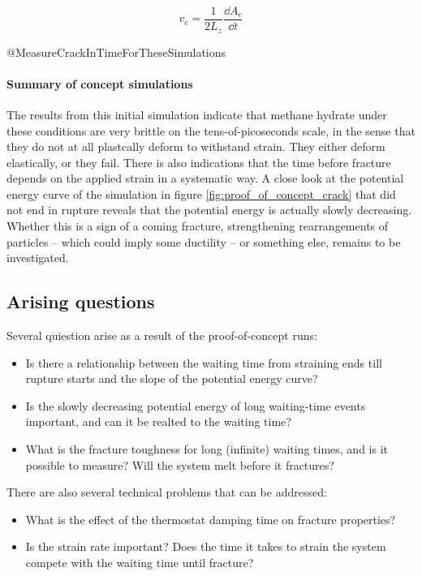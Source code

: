 \begin{equation}
v_c = \frac{1}{2L_z}\frac{\dd A_c}{\dd t}
\end{equation}

@MeasureCrackInTimeForTheseSimulations

\paragraph{Summary of concept simulations} The results from this initial simulation indicate that methane hydrate under these conditions are very brittle on the tens-of-picoseconds scale, in the sense that they do not at all plastcally deform to withstand strain. They either deform elastically, or they fail. There is also indications that the time before fracture depends on the applied strain in a systematic way. A close look at the potential energy curve of the simulation in figure \ref{fig:proof_of_concept_crack} that did not end in rupture reveals that the potential energy is actually slowly decreasing. Whether this is a sign of a coming fracture, strengthening rearrangements of particles -- which could imply some ductility -- or something else, remains to be investigated. 

\subsection{Arising questions}
Several quiestion arise as a result of the proof-of-concept runs:
\begin{itemize}
\item Is there a relationship between the waiting time from straining ends till rupture starts and the slope of the potential energy curve?
\item Is the slowly decreasing potential energy of long waiting-time events important, and can it be realted to the waiting time?
\item What is the fracture toughness for long (infinite) waiting times, and is it possible to measure? Will the system melt before it fractures?
\end{itemize}

There are also several technical problems that can be addressed:
\begin{itemize}
\item What is the effect of the thermostat damping time on fracture properties?
\item Is the strain rate important? Does the time it takes to strain the system compete with the waiting time until fracture?
\end{itemize}


